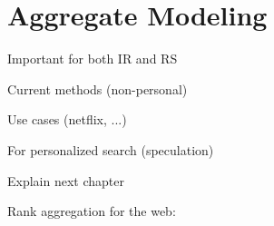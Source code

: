 \section{Aggregate Modeling}
\label{sec:aggregate}

Important for both IR and RS

Current methods (non-personal)

Use cases (netflix, ...)

For personalized search (speculation)

Explain next chapter

Rank aggregation for the web: \cite{Dwork2001}


